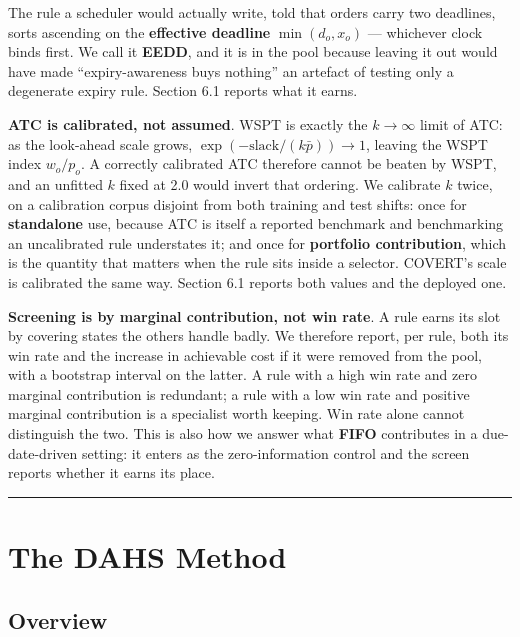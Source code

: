 \documentclass[review,3p,times]{elsarticle}
\theoremstyle{definition}
\begin{document}
The rule a scheduler would actually write, told that orders carry two
deadlines, sorts ascending on the \textbf{effective deadline}
\(\min(d_o, x_o)\) --- whichever clock binds first. We call it
\textbf{EEDD}, and it is in the pool because leaving it out would have
made ``expiry-awareness buys nothing'' an artefact of testing only a
degenerate expiry rule. Section 6.1 reports what it earns.

\textbf{ATC is calibrated, not assumed}. WSPT is exactly the
\(k \to \infty\) limit of ATC: as the look-ahead scale grows,
\(\exp(-\text{slack}/(k\bar p)) \to 1\), leaving the WSPT index
\(w_o/p_o\). A correctly calibrated ATC therefore cannot be beaten by
WSPT, and an unfitted \(k\) fixed at 2.0 would invert that ordering. We
calibrate \(k\) twice, on a calibration corpus disjoint from both
training and test shifts: once for \textbf{standalone} use, because ATC
is itself a reported benchmark and benchmarking an uncalibrated rule
understates it; and once for \textbf{portfolio contribution}, which is
the quantity that matters when the rule sits inside a selector. COVERT's
scale is calibrated the same way. Section 6.1 reports both values and
the deployed one.

\textbf{Screening is by marginal contribution, not win rate}. A rule
earns its slot by covering states the others handle badly. We therefore
report, per rule, both its win rate and the increase in achievable cost
if it were removed from the pool, with a bootstrap interval on the
latter. A rule with a high win rate and zero marginal contribution is
redundant; a rule with a low win rate and positive marginal contribution
is a specialist worth keeping. Win rate alone cannot distinguish the
two. This is also how we answer what \textbf{FIFO} contributes in a
due-date-driven setting: it enters as the zero-information control and
the screen reports whether it earns its place.

\begin{center}\rule{0.5\linewidth}{0.5pt}\end{center}

\section{The DAHS Method}\label{the-dahs-method}

\subsection{Overview}\label{overview}
\end{document}
